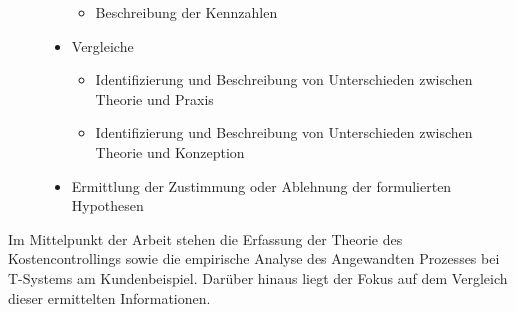 \begin{center}
\begin{description}
\begin{itemize}
\begin{itemize}
		\item Beschreibung der Kennzahlen
	\end{itemize}
	\item Vergleiche
	\begin{itemize}
		\item Identifizierung und Beschreibung von Unterschieden zwischen Theorie und Praxis
		\item Identifizierung und Beschreibung von Unterschieden zwischen Theorie und Konzeption
	\end{itemize}
	\item Ermittlung der Zustimmung oder Ablehnung der formulierten Hypothesen
\end{itemize} 
\end{description}	
\end{center}

Im Mittelpunkt der Arbeit stehen die Erfassung der Theorie des Kostencontrollings sowie die empirische Analyse des Angewandten Prozesses bei T-Systems am Kundenbeispiel. Darüber hinaus liegt der Fokus auf dem Vergleich dieser ermittelten Informationen. 


